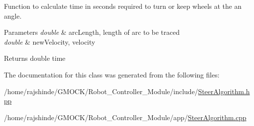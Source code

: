 Function to calculate time in seconds required to turn or keep wheels at the an angle. 


\begin{DoxyParams}{Parameters}
{\em double} & arc\+Length, length of arc to be traced \\
\hline
{\em double} & new\+Velocity, velocity \\
\hline
\end{DoxyParams}
\begin{DoxyReturn}{Returns}
double time 
\end{DoxyReturn}


The documentation for this class was generated from the following files\+:\begin{DoxyCompactItemize}
\item 
/home/rajshinde/\+G\+M\+O\+C\+K/\+Robot\+\_\+\+Controller\+\_\+\+Module/include/\hyperlink{_steer_algorithm_8hpp}{Steer\+Algorithm.\+hpp}\item 
/home/rajshinde/\+G\+M\+O\+C\+K/\+Robot\+\_\+\+Controller\+\_\+\+Module/app/\hyperlink{_steer_algorithm_8cpp}{Steer\+Algorithm.\+cpp}\end{DoxyCompactItemize}

